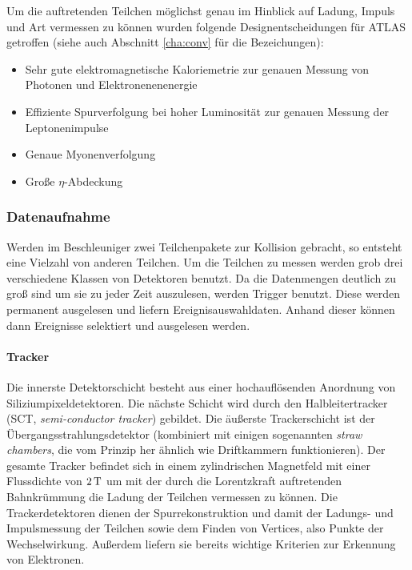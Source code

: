 Um die auftretenden Teilchen möglichst genau im Hinblick auf Ladung, Impuls und
Art vermessen zu können wurden folgende Designentscheidungen für ATLAS
getroffen\cite{atlas-tp} (siehe auch Abschnitt \ref{cha:conv} für die
Bezeichungen):
\begin{itemize}
  \item Sehr gute elektromagnetische Kaloriemetrie zur genauen Messung von
    Photonen und Elektronenenenergie
  \item Effiziente Spurverfolgung bei hoher Luminosität zur genauen Messung der
    Leptonenimpulse
  \item Genaue Myonenverfolgung
  \item Große $\eta$-Abdeckung 
\end{itemize}

\subsubsection{Datenaufnahme}
\label{cha:aufnahme}
Werden im Beschleuniger zwei Teilchenpakete zur Kollision gebracht, so entsteht
eine Vielzahl von anderen Teilchen. Um die Teilchen zu messen werden grob drei
verschiedene Klassen von Detektoren benutzt. Da die Datenmengen deutlich zu groß
sind um sie zu jeder Zeit auszulesen, werden Trigger benutzt.  Diese werden
permanent ausgelesen und liefern Ereignisauswahldaten. Anhand dieser können dann
Ereignisse selektiert und ausgelesen werden.

\paragraph{Tracker}
Die innerste Detektorschicht besteht aus einer hochauflösenden Anordnung von
Siliziumpixeldetektoren. Die nächste Schicht wird durch den Halbleitertracker
(SCT, \emph{semi-conductor tracker}) gebildet. Die äußerste Trackerschicht ist
der Übergangsstrahlungsdetektor (kombiniert mit einigen sogenannten \emph{straw
chambers}, die vom Prinzip her ähnlich wie Driftkammern funktionieren). Der
gesamte Tracker befindet sich in einem zylindrischen Magnetfeld mit einer
Flussdichte von $\unit[2]{T}$ um mit der durch die Lorentzkraft auftretenden
Bahnkrümmung die Ladung der Teilchen vermessen zu können. Die Trackerdetektoren
dienen der Spurrekonstruktion und damit der Ladungs- und Impulsmessung der
Teilchen sowie dem Finden von Vertices, also Punkte der Wechselwirkung. Außerdem
liefern sie bereits wichtige Kriterien zur Erkennung von Elektronen.

